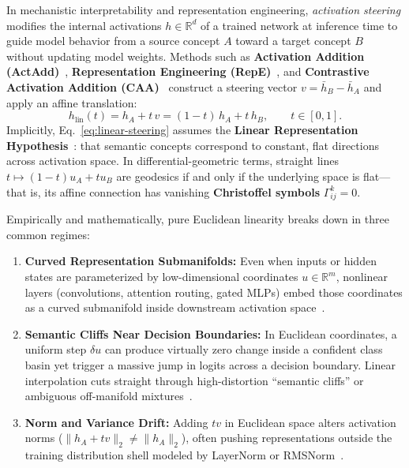 \documentclass[11pt,a4paper]{article}
\newcommand{\R}{\mathbb{R}}
\theoremstyle{definition}
\begin{document}
In mechanistic interpretability and representation engineering, \emph{activation steering} modifies the internal activations $h \in \R^d$ of a trained network at inference time to guide model behavior from a source concept $A$ toward a target concept $B$ without updating model weights. Methods such as \textbf{Activation Addition (ActAdd)}~\cite{turner2023actadd}, \textbf{Representation Engineering (RepE)}~\cite{zou2023repe}, and \textbf{Contrastive Activation Addition (CAA)}~\cite{rimsky2024caa} construct a steering vector $v = \bar{h}_B - \bar{h}_A$ and apply an affine translation:
\begin{equation}
    h_{\mathrm{lin}}(t) = h_A + t \, v = (1 - t)\, h_A + t \, h_B, \qquad t \in [0, 1].
    \label{eq:linear-steering}
\end{equation}
Implicitly, Eq.~\eqref{eq:linear-steering} assumes the \textbf{Linear Representation Hypothesis}~\cite{park2024linear}: that semantic concepts correspond to constant, flat directions across activation space. In differential-geometric terms, straight lines $t \mapsto (1-t)u_A + t u_B$ are geodesics if and only if the underlying space is flat---that is, its affine connection has vanishing \textbf{Christoffel symbols} $\Gamma^k_{ij} = 0$.

Empirically and mathematically, pure Euclidean linearity breaks down in three common regimes:
\begin{enumerate}[leftmargin=*]
    \item \textbf{Curved Representation Submanifolds:} Even when inputs or hidden states are parameterized by low-dimensional coordinates $u \in \R^m$, nonlinear layers (convolutions, attention routing, gated MLPs) embed those coordinates as a curved submanifold inside downstream activation space~\cite{arvanitidis2018oddity,engels2024nonlinear}.
    \item \textbf{Semantic Cliffs Near Decision Boundaries:} In Euclidean coordinates, a uniform step $\delta u$ can produce virtually zero change inside a confident class basin yet trigger a massive jump in logits across a decision boundary. Linear interpolation cuts straight through high-distortion ``semantic cliffs'' or ambiguous off-manifold mixtures~\cite{wurgaft2026manifold,oozeer2026riemannian}.
    \item \textbf{Norm and Variance Drift:} Adding $t v$ in Euclidean space alters activation norms ($\|h_A + t v\|_2 \neq \|h_A\|_2$), often pushing representations outside the training distribution shell modeled by LayerNorm or RMSNorm~\cite{kazama2026geosteer}.
\end{enumerate}
\end{document}
